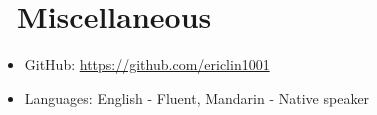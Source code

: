 \documentclass{resume}
\begin{document}
		\section{\faInfo\ Miscellaneous}
		\begin{itemize}[parsep=0.5ex]
			\item GitHub: \url{https://github.com/ericlin1001}
			\item Languages: English - Fluent, Mandarin - Native speaker
		\end{itemize}

		
\end{document}
